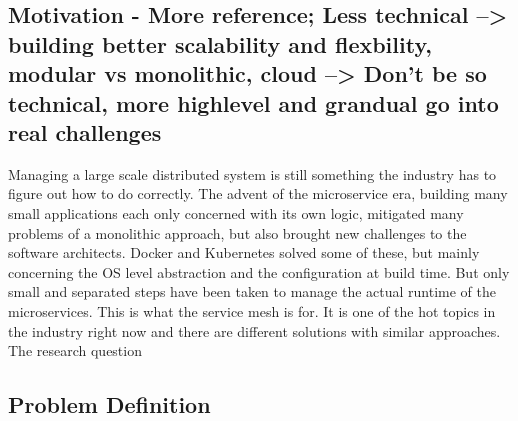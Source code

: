 \subsection{Motivation - More reference; Less technical --> building better scalability and flexbility, modular vs monolithic, cloud --> Don't be so technical, more highlevel and grandual go into real challenges}
Managing a large scale distributed system is still something the industry has to figure out how to do correctly. The advent of the microservice era, building many small applications each only concerned with its own logic, mitigated many problems of a monolithic approach, but also brought new challenges to the software architects. Docker and Kubernetes solved some of these, but mainly concerning the OS level abstraction and the configuration at build time. But only small and separated steps have been taken to manage the actual runtime of the microservices. This is what the service mesh is for. It is one of the hot topics in the industry right now and there are different solutions with similar approaches.
\\
The research question

\subsection{Problem Definition}